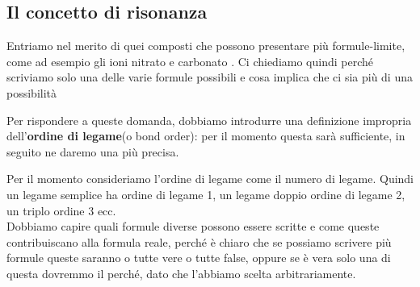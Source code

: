 \subsection{Il concetto di risonanza}
Entriamo nel merito di quei composti che possono presentare più formule-limite, come ad esempio gli ioni nitrato  e carbonato . Ci chiediamo quindi perché scriviamo solo una delle varie formule possibili e cosa implica che ci sia più di una possibilità

Per rispondere a queste domanda, dobbiamo introdurre una definizione impropria dell'\textbf{ordine di legame}(o bond order): per il momento questa sarà sufficiente, in seguito ne daremo una più precisa. 

Per il momento consideriamo l'ordine di legame come il numero di legame. Quindi un legame semplice ha ordine di legame 1, un legame doppio ordine di legame 2, un triplo ordine 3 ecc.\\

Dobbiamo capire quali formule diverse possono essere scritte e come queste contribuiscano alla formula reale, perché è chiaro che se possiamo scrivere più formule queste saranno o tutte vere o tutte false, oppure se è vera solo una di questa dovremmo il perché, dato che l'abbiamo scelta arbitrariamente.

